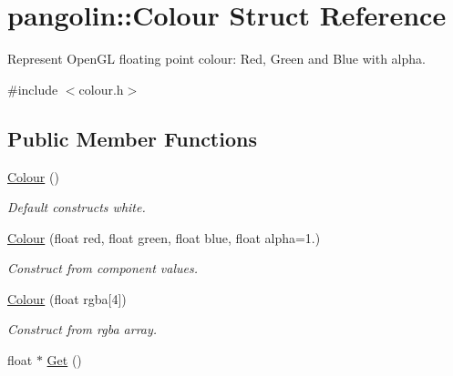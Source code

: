 \hypertarget{structpangolin_1_1_colour}{}\section{pangolin\+:\+:Colour Struct Reference}
\label{structpangolin_1_1_colour}


Represent Open\+GL floating point colour\+: Red, Green and Blue with alpha.  




{\ttfamily \#include $<$colour.\+h$>$}

\subsection*{Public Member Functions}
\begin{DoxyCompactItemize}
\item 
\hyperlink{structpangolin_1_1_colour_af104120f620167f683d7eaa02924e70b}{Colour} ()\hypertarget{structpangolin_1_1_colour_af104120f620167f683d7eaa02924e70b}{}\label{structpangolin_1_1_colour_af104120f620167f683d7eaa02924e70b}

\begin{DoxyCompactList}\small\item\em Default constructs white. \end{DoxyCompactList}\item 
\hyperlink{structpangolin_1_1_colour_a8f2a64fe74d5048185450333526edaef}{Colour} (float red, float green, float blue, float alpha=1.)\hypertarget{structpangolin_1_1_colour_a8f2a64fe74d5048185450333526edaef}{}\label{structpangolin_1_1_colour_a8f2a64fe74d5048185450333526edaef}

\begin{DoxyCompactList}\small\item\em Construct from component values. \end{DoxyCompactList}\item 
\hyperlink{structpangolin_1_1_colour_aad7b39a22043478cade30fa1a07958ed}{Colour} (float rgba\mbox{[}4\mbox{]})\hypertarget{structpangolin_1_1_colour_aad7b39a22043478cade30fa1a07958ed}{}\label{structpangolin_1_1_colour_aad7b39a22043478cade30fa1a07958ed}

\begin{DoxyCompactList}\small\item\em Construct from rgba array. \end{DoxyCompactList}\item 
float $\ast$ \hyperlink{structpangolin_1_1_colour_aba37f36802ae8559ba79188b8e5c7832}{Get} ()\hypertarget{structpangolin_1_1_colour_aba37f36802ae8559ba79188b8e5c7832}{}\label{structpangolin_1_1_colour_aba37f36802ae8559ba79188b8e5c7832}


\end{DoxyCompactItemize}
